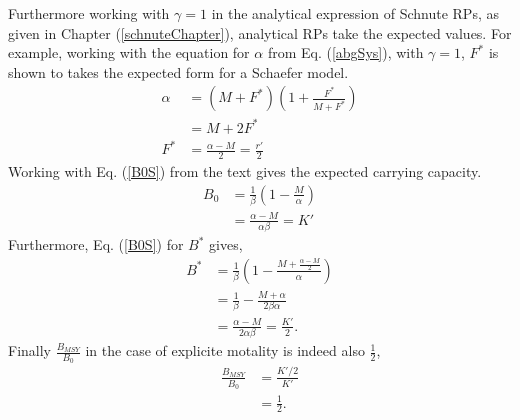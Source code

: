 %
Furthermore working with $\gamma=1$ in the analytical expression of Schnute RPs, 
as given in Chapter (\ref{schnuteChapter}), analytical RPs take the expected 
values. For example, working with the equation for $\alpha$ from Eq. (\ref{abgSys}), 
with $\gamma=1$, $F^*$ is shown to takes the expected form for a Schaefer model.
\begin{align}
\alpha &= (M+F^*)\left(1+\frac{F^*}{M+F^*}\right) \nonumber\\
       &= M+2F^* \nonumber\\
   F^* &= \frac{\alpha-M}{2} = \frac{r'}{2} 
\end{align}
Working with Eq. (\ref{B0S}) from the text gives the expected carrying capacity.
\begin{align}
B_0 &= \frac{1}{\beta} \left( 1-\frac{M}{\alpha} \right) \nonumber\\
    &= \frac{\alpha-M}{\alpha\beta} = K'
\end{align}
Furthermore, Eq. (\ref{B0S}) for $B^*$ gives,
\begin{align}
    B^* &= \frac{1}{\beta} \left( 1-\frac{M+\frac{\alpha-M}{2}}{\alpha}\right) \nonumber\\
        &= \frac{1}{\beta} - \frac{M+\alpha}{2\beta\alpha}\nonumber\\
        &= \frac{\alpha-M}{2\alpha\beta} = \frac{K'}{2}.
\end{align}
%
Finally $\frac{B_{MSY}}{B_0}$ in the case of explicite motality is indeed also $\frac{1}{2}$,
\begin{align}
\frac{B_{MSY}}{B_0}&=\frac{K'/2}{K'}\nonumber\\
&=\frac{1}{2}.
\end{align}
